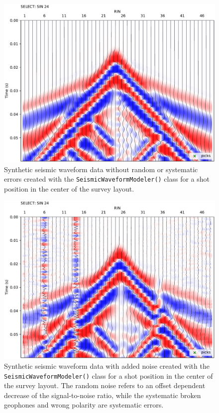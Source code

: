 \documentclass[a4paper,fleqn]{cas-sc}
\begin{document}
\begin{figure}
	\centering
	\includegraphics[width=.75\textwidth]{figures/syn_clean_sin24.pdf}
	\caption{Synthetic seismic waveform data without random or systematic errors created with the \texttt{SeismicWaveformModeler()} class for a shot position in the center of the survey layout.}
	\label{fig:syndata_clean}
\end{figure}

\begin{figure}
	\centering
	\includegraphics[width=.75\textwidth]{figures/syn_noise_sin24.pdf}
	\caption{Synthetic seismic waveform data with added noise created with the \texttt{SeismicWaveformModeler()} class for a shot position in the center of the survey layout. The random noise refers to an offset dependent decrease of the signal-to-noise ratio, while the systematic broken geophones and wrong polarity are systematic errors.}
	\label{fig:syndata_noise}
\end{figure}
\end{document}

